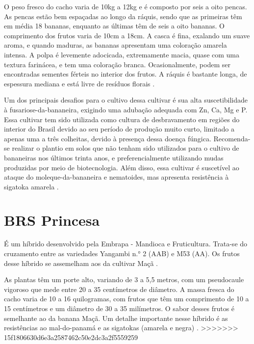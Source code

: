 O peso fresco do cacho varia de 10kg a 12kg e é composto por seis a oito pencas. As pencas estão bem espaçadas ao longo da ráquis, sendo que as primeiras têm em média 18 bananas, enquanto as últimas têm de seis a oito bananas. O comprimento dos frutos varia de 10cm a 18cm. A casca é fina, exalando um suave aroma, e quando maduras, as bananas apresentam uma coloração amarela intensa. A polpa é levemente adocicada, extremamente macia, quase com uma textura farinácea, e tem uma coloração branca. Ocasionalmente, podem ser encontradas sementes férteis no interior dos frutos. A ráquis é bastante longa, de espessura mediana e está livre de resíduos florais \cite{cultivodebananeira}.

Um dos principais desafios para o cultivo dessa cultivar é sua alta suscetibilidade à fusariose-da-bananeira, exigindo uma adubação adequada com Zn, Ca, Mg e P. Essa cultivar tem sido utilizada como cultura de desbravamento em regiões do interior do Brasil devido ao seu período de produção muito curto, limitado a apenas uma a três colheitas, devido à presença dessa doença fúngica. Recomenda-se realizar o plantio em solos que não tenham sido utilizados para o cultivo de bananeiras nos últimos trinta anos, e preferencialmente utilizando mudas produzidas por meio de biotecnologia. Além disso, essa cultivar é suscetível ao ataque do moleque-da-bananeira e nematoides, mas apresenta resistência à sigatoka amarela \cite{cultivodebananeira}.

\section{BRS Princesa}
É um híbrido desenvolvido pela Embrapa - Mandioca e Fruticultura. Trata-se do cruzamento entre as variedades Yangambi n.° 2 (AAB) e M53 (AA). Os frutos desse híbrido se assemelham aos da cultivar Maçã \cite{cultivodebananeira}. 

As plantas têm um porte alto, variando de 3 a 5,5 metros, com um pseudocaule vigoroso que mede entre 20 a 35 centímetros de diâmetro. A massa fresca do cacho varia de 10 a 16 quilogramas, com frutos que têm um comprimento de 10 a 15 centímetros e um diâmetro de 30 a 35 milímetros. O sabor desses frutos é semelhante ao da banana Maçã. Um detalhe importante nesse híbrido é as resistências ao mal-do-panamá e as sigatokas (amarela e negra) \cite{cultivodebananeira}.
>>>>>>> 15f1806630d6e3a2587462c50e2dc3a2f5559259
